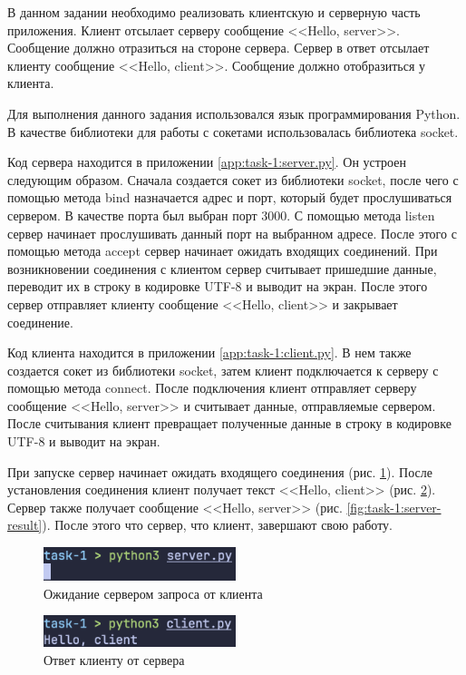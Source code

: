 \documentclass[a4paper, 14pt]{extarticle}
\begin{document}
В данном задании необходимо реализовать клиентскую и серверную часть приложения.
Клиент отсылает серверу сообщение <<Hello, server>>. Сообщение должно отразиться
на стороне сервера. Сервер в ответ отсылает клиенту сообщение <<Hello, client>>.
Сообщение должно отобразиться у клиента.

Для выполнения данного задания использовался язык программирования Python. В
качестве библиотеки для работы с сокетами использовалась библиотека socket.

Код сервера находится в приложении \ref{app:task-1:server.py}. Он устроен
следующим образом. Сначала создается сокет из библиотеки socket, после чего с
помощью метода bind назначается адрес и порт, который будет прослушиваться
сервером. В качестве порта был выбран порт 3000. С помощью метода listen сервер
начинает прослушивать данный порт на выбранном адресе. После этого с помощью
метода accept сервер начинает ожидать входящих соединений. При возникновении
соединения с клиентом сервер считывает пришедшие данные, переводит их в строку в
кодировке UTF-8 и выводит на экран. После этого сервер отправляет клиенту
сообщение <<Hello, client>> и закрывает соединение.

Код клиента находится в приложении \ref{app:task-1:client.py}. В нем также
создается сокет из библиотеки socket, затем клиент подключается к серверу с
помощью метода connect. После подключения клиент отправляет серверу сообщение
<<Hello, server>> и считывает данные, отправляемые сервером. После считывания
клиент превращает полученные данные в строку в кодировке UTF-8 и выводит на
экран.

При запуске сервер начинает ожидать входящего соединения (рис.
\ref{fig:task-1:server-waits}). После установления соединения клиент получает
текст <<Hello, client>> (рис. \ref{fig:task-1:client-result}). Сервер также
получает сообщение <<Hello, server>> (рис. \ref{fig:task-1:server-result}).
После этого что сервер, что клиент, завершают свою работу.

\begin{figure}[H]
  \centering
  \includegraphics[width=0.5\textwidth]{images/task-1/server-waits.png}
  \caption{Ожидание сервером запроса от клиента}
  \label{fig:task-1:server-waits}
\end{figure}

\begin{figure}[H]
  \centering
  \includegraphics[width=0.5\textwidth]{images/task-1/client-result.png}
  \caption{Ответ клиенту от сервера}
  \label{fig:task-1:client-result}
\end{figure}
\end{document}
